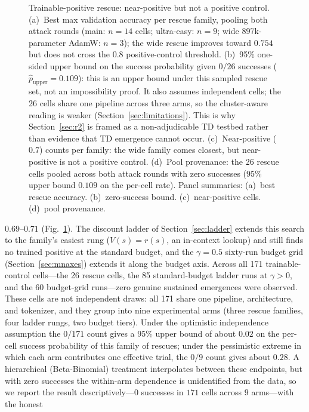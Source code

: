 \documentclass[11pt]{article}
\theoremstyle{plain}
\theoremstyle{definition}
\begin{document}
\begin{figure}[htbp]
\centering
{}
\caption{Trainable-positive rescue: near-positive but not a positive control.
(a)~Best max validation accuracy per rescue family, pooling both attack rounds
(main: $n=14$ cells; ultra-easy: $n=9$; wide 897k-parameter AdamW: $n=3$); the wide
rescue improves toward $0.754$ but does not
cross the $0.8$ positive-control threshold.
(b)~95\% one-sided upper bound on the success probability given $0/26$ successes
($\hat{p}_{\mathrm{upper}}=0.109$): this is an upper bound under this sampled rescue set,
not an impossibility proof. It also assumes independent cells; the 26 cells share one
pipeline across three arms, so the cluster-aware reading is weaker
(Section~\ref{sec:limitations}).
This is why Section~\ref{sec:r2} is framed as a non-adjudicable TD testbed rather than evidence that
TD emergence cannot occur.
(c)~Near-positive ($0.7$) counts per family: the wide family comes closest,
but near-positive is not a positive control.
(d)~Pool provenance: the 26 rescue cells pooled across both attack rounds
with zero successes (95\% upper bound $0.109$ on the per-cell rate).
Panel summaries: (a)~best rescue accuracy. (b)~zero-success bound. (c)~near-positive cells. (d)~pool provenance.}
\label{fig:positive-rescue}
\end{figure}
$0.69$--$0.71$ (Fig.~\ref{fig:positive-rescue}). The discount ladder of
Section~\ref{sec:ladder} extends this search to the family's easiest rung ($V(s)=r(s)$,
an in-context lookup) and still finds no trained positive at the standard budget, and
the $\gamma=0.5$ sixty-run budget grid (Section~\ref{sec:mnaxes}) extends it along the
budget axis. Across all 171 trainable-control cells---the 26 rescue cells, the 85
standard-budget ladder runs at $\gamma>0$, and the 60 budget-grid runs---zero genuine
sustained emergences were observed. These cells are not independent draws: all 171 share
one pipeline, architecture, and tokenizer, and they group into nine experimental arms
(three rescue families, four ladder rungs, two budget tiers). Under the optimistic
independence assumption the $0/171$ count gives a 95\% upper bound of about $0.02$ on the
per-cell success probability of this family of rescues; under the pessimistic extreme in
which each arm contributes one effective trial, the $0/9$ count gives about $0.28$. A
hierarchical (Beta-Binomial) treatment interpolates between these endpoints, but with
zero successes the within-arm dependence is unidentified from the data, so we report the
result descriptively---$0$ successes in $171$ cells across $9$ arms---with the honest
\end{document}
